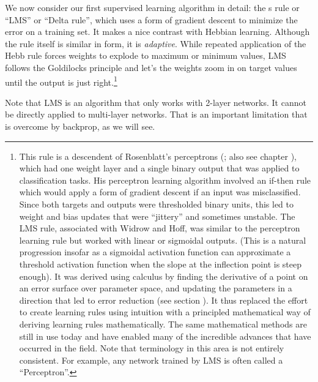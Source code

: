 We now consider our first supervised learning algorithm in detail: the s rule or ``LMS'' or ``Delta rule'', which uses a form of gradient descent to minimize the error on a training set. It makes a nice contrast with Hebbian learning. Although the rule itself is similar in form, it is \emph{adaptive}.  While repeated application of the Hebb rule forces weights to explode to maximum or minimum values, LMS follows the Goldilocks principle and let's the weights zoom in on target values until the output is just right.\footnote{This rule is a descendent of Rosenblatt's perceptrons (\cite{rosenblatt1960perceptron}; also see chapter ), which had one weight layer and a single binary output that was applied to classification tasks.  His perceptron learning algorithm involved an if-then rule which would apply a form of gradient descent if an input was misclassified. Since both targets and outputs were thresholded binary units, this led to weight and bias updates that were ``jittery'' and sometimes unstable. The LMS rule, associated with Widrow and Hoff, was similar to the perceptron learning rule but worked with linear or sigmoidal outputs. (This is a natural progression insofar as a sigmoidal activation function can approximate a threshold activation function when the slope at the inflection point is steep enough). It was derived using calculus by finding the derivative of a point on an error surface over parameter space, and updating the parameters in a direction that led to error reduction (see section ). It thus replaced the effort to create learning rules using intuition with a principled mathematical way of deriving learning rules mathematically. The same mathematical methods are still in use today and have enabled many of the incredible advances that have occurred in the field. Note that terminology  in this  area is not entirely consistent. For example, any network trained by LMS is often called a ``Perceptron''. }  

Note that LMS is an algorithm that only works with 2-layer networks. It cannot be directly applied to multi-layer networks. That is an important limitation that is overcome by backprop, as we will see.

